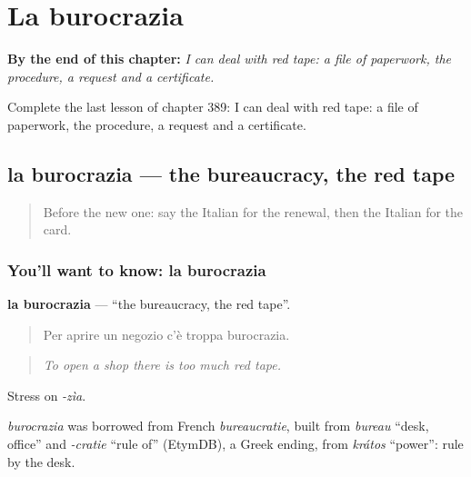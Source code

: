 
\chapter{La burocrazia}
\label{ch:it-la-burocrazia}

\begin{chapteropening}
\textbf{By the end of this chapter:} \emph{I can deal with red tape: a file of paperwork, the procedure, a request and a certificate.}

Complete the last lesson of chapter 389: I can deal with red tape: a file of paperwork, the procedure, a request and a certificate.
\end{chapteropening}

\section[la burocrazia]{la burocrazia — the bureaucracy, the red tape}

\label{lesson:IT-C389-burocrazia}



\begin{quote}
Before the new one: say the Italian for the renewal, then the Italian for the card.
\end{quote}

\subsection*{You'll want to know: la burocrazia}
\textbf{la burocrazia} — \textquotedblleft{}the bureaucracy, the red tape\textquotedblright{}.

\begin{quote}
Per aprire un negozio c'è troppa burocrazia.
\end{quote}

\begin{quote}
\emph{To open a shop there is too much red tape.}
\end{quote}

Stress on \emph{-zìa}.

\begin{cousinweb}
\emph{burocrazia} was borrowed from French \emph{bureaucratie}, built from \emph{bureau} \textquotedblleft{}desk, office\textquotedblright{} and \emph{-cratie} \textquotedblleft{}rule of\textquotedblright{} (EtymDB), a Greek ending, from \emph{krátos} \textquotedblleft{}power\textquotedblright{}: rule by the desk.
\end{cousinweb}

